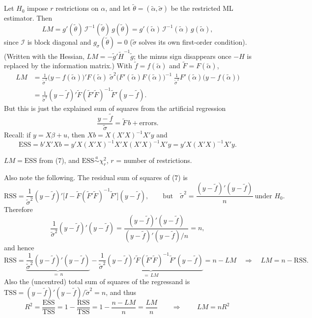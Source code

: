 \documentclass[11pt]{article}
\begin{document}
Let $H_{0}$ impose $r$ restrictions on $\alpha$, and let $\tilde\theta=(\tilde\alpha,\tilde\sigma)$ be the restricted
ML estimator. Then
\[ LM=g'(\tilde\theta)\,\mathcal I^{-1}(\tilde\theta)\,g(\tilde\theta)=g'(\tilde\alpha)\,\mathcal I^{-1}(\tilde\alpha)\,g(\tilde\alpha), \]
since $\mathcal I$ is block diagonal and $g_{\sigma}(\tilde\theta)=0$ ($\tilde\sigma$ solves its own first-order
condition). (Written with the Hessian, $LM=-\tilde g'\tilde H^{-1}\tilde g$; the minus sign disappears once
$-H$ is replaced by the information matrix.) With $\tilde f=f(\tilde\alpha)$ and $\tilde F=F(\tilde\alpha)$,
\begin{align*}
 LM&=\frac1{\tilde\sigma^{2}}\bigl(y-f(\tilde\alpha)\bigr)'F(\tilde\alpha)\;\tilde\sigma^{2}\bigl(F'(\tilde\alpha)F(\tilde\alpha)\bigr)^{-1}\;\frac1{\tilde\sigma^{2}}F'(\tilde\alpha)\bigl(y-f(\tilde\alpha)\bigr)\\
   &=\frac1{\tilde\sigma^{2}}(y-\tilde f)'\tilde F(\tilde F'\tilde F)^{-1}\tilde F'(y-\tilde f).
\end{align*}
But this is just the explained sum of squares from the artificial regression
\begin{equation}\tag{7}
 \frac{y-\tilde f}{\tilde\sigma}=\tilde F\,b+\text{errors}.
\end{equation}
Recall: if $y=X\beta+u$, then $Xb=X(X'X)^{-1}X'y$ and
\[ \mathrm{ESS}=b'X'Xb=y'X(X'X)^{-1}X'X(X'X)^{-1}X'y=y'X(X'X)^{-1}X'y. \]

$LM=\mathrm{ESS}$ from (7), and $\mathrm{ESS}\overset{a}{\sim}\chi^{2}_{r}$, $r$ = number of restrictions.

Also note the following. The residual sum of squares of (7) is
\[ \mathrm{RSS}=\frac1{\tilde\sigma^{2}}(y-\tilde f)'\bigl[I-\tilde F(\tilde F'\tilde F)^{-1}\tilde F'\bigr](y-\tilde f),
   \qquad\text{but}\quad\tilde\sigma^{2}=\frac{(y-\tilde f)'(y-\tilde f)}{n}\ \text{under }H_{0}. \]
Therefore
\[ \frac1{\tilde\sigma^{2}}(y-\tilde f)'(y-\tilde f)=\frac{(y-\tilde f)'(y-\tilde f)}{(y-\tilde f)'(y-\tilde f)/n}=n, \]
and hence
\[ \mathrm{RSS}=\underbrace{\frac1{\tilde\sigma^{2}}(y-\tilde f)'(y-\tilde f)}_{=\,n}
   -\underbrace{\frac1{\tilde\sigma^{2}}(y-\tilde f)'\tilde F(\tilde F'\tilde F)^{-1}\tilde F'(y-\tilde f)}_{=\,LM}
   =n-LM
   \quad\Longrightarrow\quad LM=n-\mathrm{RSS}. \]
Also the (uncentred) total sum of squares of the regressand is
$\mathrm{TSS}=(y-\tilde f)'(y-\tilde f)/\tilde\sigma^{2}=n$, and thus
\[ R^{2}=\frac{\mathrm{ESS}}{\mathrm{TSS}}=1-\frac{\mathrm{RSS}}{\mathrm{TSS}}=1-\frac{n-LM}{n}=\frac{LM}{n}
   \qquad\Longrightarrow\qquad\boxed{\,LM=nR^{2}\,} \]
\end{document}

